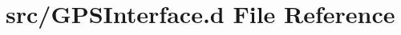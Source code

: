 \hypertarget{_g_p_s_interface_8d}{}\section{src/\+G\+P\+S\+Interface.d File Reference}
\label{_g_p_s_interface_8d}
